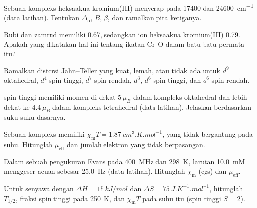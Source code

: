 \begin{exercise}[$\star\star$]\label{exo:b3:complex-spectra-magnetism:6}
Sebuah kompleks heksaakua kromium(III) menyerap pada 17400 dan \qty{24600}{cm^{-1}} (data
latihan). Tentukan $\Delta_{\mathrm o}$, $B$, $\beta$, dan ramalkan pita ketiganya.
\end{exercise}

\begin{exercise}[$\star\star$]\label{exo:b3:complex-spectra-magnetism:7}
Rubi dan zamrud memiliki  0.67, sedangkan ion heksaakua kromium(III)
0.79. Apakah yang dikatakan hal ini tentang ikatan Cr--O dalam batu-batu permata itu?
\end{exercise}

\begin{exercise}[$\star\star$]\label{exo:b3:complex-spectra-magnetism:8}
Ramalkan distorsi Jahn--Teller yang kuat, lemah, atau tidak ada untuk $d^9$ oktahedral, $d^4$
spin tinggi, $d^7$ spin rendah, $d^3$, $d^6$ spin tinggi, dan $d^6$ spin rendah.
\end{exercise}

\begin{exercise}[$\star\star$]\label{exo:b3:complex-spectra-magnetism:9}
 spin tinggi memiliki momen di dekat $5\,\mu_B$ dalam kompleks oktahedral dan lebih dekat ke
$4.4\,\mu_B$ dalam kompleks tetrahedral (data latihan). Jelaskan berdasarkan suku-suku
dasarnya.
\end{exercise}

\begin{exercise}[$\star\star\star$]\label{exo:b3:complex-spectra-magnetism:10}
Sebuah kompleks memiliki $\chi_{\mathrm m}T = \qty{1.87}{cm^3.K.mol^{-1}}$, yang tidak bergantung pada suhu. Hitunglah $\mu_{\mathrm{eff}}$ dan
jumlah elektron yang tidak berpasangan.
\end{exercise}

\begin{exercise}[$\star\star\star$]\label{exo:b3:complex-spectra-magnetism:11}
Dalam sebuah pengukuran Evans pada \qty{400}{MHz} dan \qty{298}{K}, larutan \qty{10.0}{mM} menggeser
acuan sebesar \qty{25.0}{Hz} (data latihan). Hitunglah $\chi_{\mathrm m}$ (cgs) dan $\mu_{\mathrm{eff}}$.
\end{exercise}

\begin{exercise}[$\star\star\star$]\label{exo:b3:complex-spectra-magnetism:12}
Untuk senyawa  dengan $\Delta H = \qty{15}{kJ/mol}$ dan $\Delta S = \qty{75}{J.K^{-1}.mol^{-1}}$, hitunglah $T_{1/2}$,
fraksi spin tinggi pada \qty{250}{K}, dan $\chi_{\mathrm m}T$ pada suhu itu (spin tinggi $S = 2$).
\end{exercise}

